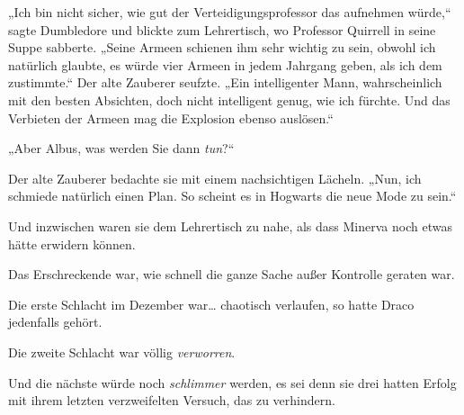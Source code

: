 „Ich bin nicht sicher, wie gut der Verteidigungsprofessor das aufnehmen würde,“ sagte Dumbledore und blickte zum Lehrertisch, wo Professor Quirrell in seine Suppe sabberte. „Seine Armeen schienen ihm sehr wichtig zu sein, obwohl ich natürlich glaubte, es würde vier Armeen in jedem Jahrgang geben, als ich dem zustimmte.“ Der alte Zauberer seufzte. „Ein intelligenter Mann, wahrscheinlich mit den besten Absichten, doch nicht intelligent genug, wie ich fürchte. Und das Verbieten der Armeen mag die Explosion ebenso auslösen.“

„Aber Albus, was werden Sie dann \emph{tun}?“

Der alte Zauberer bedachte sie mit einem nachsichtigen Lächeln. „Nun, ich schmiede natürlich einen Plan. So scheint es in Hogwarts die neue Mode zu sein.“

Und inzwischen waren sie dem Lehrertisch zu nahe, als dass Minerva noch etwas hätte erwidern können.

\later

Das Erschreckende war, wie schnell die ganze Sache außer Kontrolle geraten war.

Die erste Schlacht im Dezember war… chaotisch verlaufen, so hatte Draco jedenfalls gehört.

Die zweite Schlacht war völlig \emph{verworren}.

Und die nächste würde noch \emph{schlimmer} werden, es sei denn sie drei hatten Erfolg mit ihrem letzten verzweifelten Versuch, das zu verhindern.

